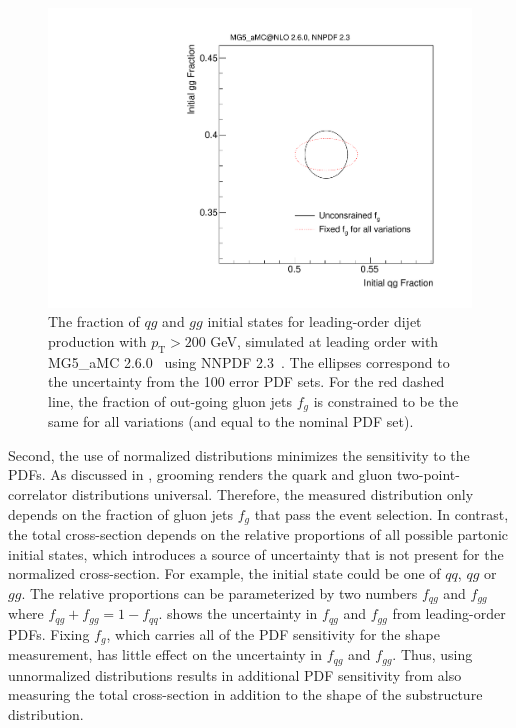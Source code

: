 \begin{figure}[t]
\begin{center}
\includegraphics[width = 0.5\columnwidth]{figures/PDFs.pdf}
\end{center}
\caption{The fraction of $qg$ and $gg$ initial states for leading-order dijet production with $p_\text{T}>200$ GeV, simulated at leading order with MG5\_aMC 2.6.0~\cite{Alwall:2014hca} using NNPDF 2.3~\cite{Ball:2012cx}.  The ellipses correspond to the uncertainty from the 100 error PDF sets.  For the red dashed line, the fraction of out-going gluon jets $f_g$ is constrained to be the same for all variations (and equal to the nominal PDF set).}
\label{fig:pdf}
\end{figure}

Second, the use of normalized distributions minimizes the sensitivity to the PDFs.
%
As discussed in , grooming renders the quark and gluon two-point-correlator distributions universal.
%
Therefore, the measured distribution only depends on the fraction of gluon jets $f_g$ that pass the event selection.
%
In contrast, the total cross-section depends on the relative proportions of all possible partonic initial states, which introduces a source of uncertainty that is not present for the normalized cross-section.
%
For example, the initial state could be one of $qq$, $qg$ or $gg$.
%
The relative proportions can be parameterized by two numbers $f_{qg}$ and $f_{gg}$ where $f_{qg}+f_{gg}=1-f_{qq}$.
%
 shows the uncertainty in $f_{qg}$ and $f_{gg}$ from leading-order PDFs.
%
Fixing $f_g$, which carries all of the PDF sensitivity for the shape measurement, has little effect on the uncertainty in $f_{qg}$ and $f_{gg}$.
%
Thus, using unnormalized distributions results in additional PDF sensitivity from also measuring the total cross-section in addition to the shape of the substructure distribution.  

